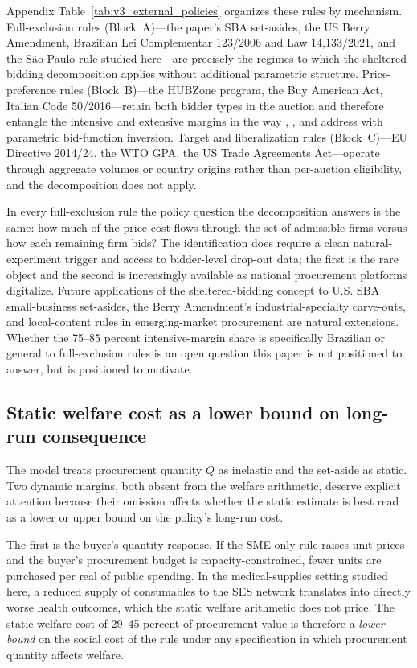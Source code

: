 Appendix Table~\ref{tab:v3_external_policies} organizes these rules by mechanism. Full-exclusion rules (Block~A)---the paper's SBA set-asides, the US Berry Amendment, Brazilian Lei Complementar 123/2006 and Law 14{,}133/2021, and the S\~ao Paulo rule studied here---are precisely the regimes to which the sheltered-bidding decomposition applies without additional parametric structure. Price-preference rules (Block~B)---the HUBZone program, the Buy American Act, Italian Code 50/2016---retain both bidder types in the auction and therefore entangle the intensive and extensive margins in the way \citet{marion2007}, \citet{krasnokutskaya2011}, and \citet{atheyseira2011} address with parametric bid-function inversion. Target and liberalization rules (Block~C)---EU Directive 2014/24, the WTO GPA, the US Trade Agreements Act---operate through aggregate volumes or country origins rather than per-auction eligibility, and the decomposition does not apply.

In every full-exclusion rule the policy question the decomposition answers is the same: how much of the price cost flows through the set of admissible firms versus how each remaining firm bids? The identification does require a clean natural-experiment trigger and access to bidder-level drop-out data; the first is the rare object and the second is increasingly available as national procurement platforms digitalize. Future applications of the sheltered-bidding concept to U.S. SBA small-business set-asides, the Berry Amendment's industrial-specialty carve-outs, and local-content rules in emerging-market procurement are natural extensions. Whether the 75--85 percent intensive-margin share is specifically Brazilian or general to full-exclusion rules is an open question this paper is not positioned to answer, but is positioned to motivate.

\subsection{Static welfare cost as a lower bound on long-run consequence}\label{sec:dynamics}

The model treats procurement quantity $Q$ as inelastic and the set-aside as static. Two dynamic margins, both absent from the welfare arithmetic, deserve explicit attention because their omission affects whether the static estimate is best read as a lower or upper bound on the policy's long-run cost.

The first is the buyer's quantity response. If the SME-only rule raises unit prices and the buyer's procurement budget is capacity-constrained, fewer units are purchased per real of public spending. In the medical-supplies setting studied here, a reduced supply of consumables to the SES network translates into directly worse health outcomes, which the static welfare arithmetic does not price. The static welfare cost of 29--45 percent of procurement value is therefore a \emph{lower bound} on the social cost of the rule under any specification in which procurement quantity affects welfare.

